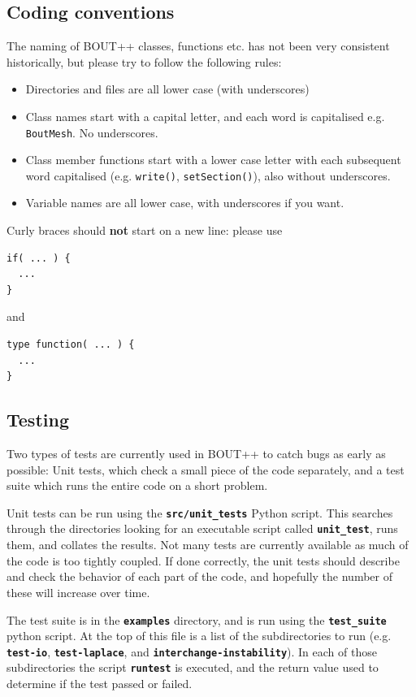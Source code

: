 \documentclass[12pt]{article}
\newcommand{\code}[1]{\texttt{#1}}
\newcommand{\file}[1]{\texttt{\bf #1}}
\begin{document}
\subsection{Coding conventions}

The naming of BOUT++ classes, functions etc. has not been very consistent
historically, but please try to follow the following rules:
\begin{itemize}
\item Directories and files are all lower case (with underscores)
\item Class names start with a capital letter, and each word is capitalised e.g. \code{BoutMesh}. No underscores.
\item Class member functions start with a lower case letter with each subsequent word capitalised (e.g. \code{write()}, \code{setSection()}), also without underscores.
\item Variable names are all lower case, with underscores if you want.
\end{itemize}

Curly braces should {\bf not} start on a new line: please use
\begin{lstlisting}
if( ... ) {
  ...
}
\end{lstlisting}
and
\begin{lstlisting}
type function( ... ) {
  ...
}
\end{lstlisting}

\subsection{Testing}

Two types of tests are currently used in BOUT++ to catch bugs as early as possible: Unit tests, which 
check a small piece of the code separately, and a test suite which runs the entire code on a short problem.

Unit tests can be run using the \file{src/unit\_tests} Python script. This searches through the directories
looking for an executable script called \file{unit\_test}, runs them, and collates the results. Not many
tests are currently available as much of the code is too tightly coupled. If done correctly, the unit tests
should describe and check the behavior of each part of the code, and hopefully the number of these will increase
over time.

The test suite is in the \file{examples} directory, and is run using the \file{test\_suite} python script. At the top
of this file is a list of the subdirectories to run (e.g. \file{test-io}, \file{test-laplace}, and \file{interchange-instability}). In each of those subdirectories the script \file{runtest} is executed, and the return value used to determine if the test passed or failed.
\end{document}
